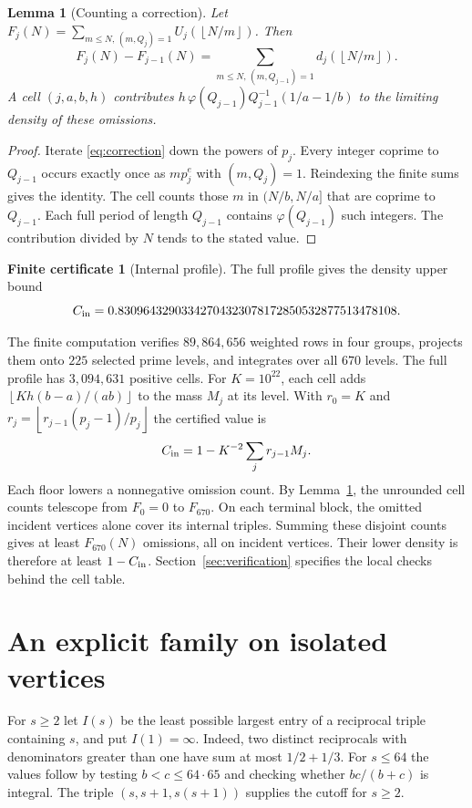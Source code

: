 \documentclass[11pt,letterpaper]{article}
\newtheorem{lemma}[theorem]{Lemma}
\theoremstyle{definition}
\newtheorem{certificate}[theorem]{Finite certificate}
\newcommand{\cin}{C_{\rm in}}
\newcommand{\floor}[1]{\left\lfloor #1\right\rfloor}
\begin{document}
\begin{lemma}[Counting a correction]\label{lem:telescoping}
Let $F_j(N)=\sum_{m\le N,\,(m,Q_j)=1} U_j(\floor{N/m})$. Then
\[
 F_j(N)-F_{j-1}(N)
    =\sum_{m\le N,\,(m,Q_{j-1})=1} d_j(\floor{N/m}).
\]
A cell $(j,a,b,h)$ contributes
$h\,\varphi(Q_{j-1})Q_{j-1}^{-1}(1/a-1/b)$ to the limiting
density of these omissions.
\end{lemma}
\begin{proof}
Iterate \eqref{eq:correction} down the powers of $p_j$. Every integer
coprime to $Q_{j-1}$ occurs exactly once as $m p_j^e$ with
$(m,Q_j)=1$. Reindexing the finite sums gives the identity. The cell
counts those $m$ in $(N/b,N/a]$ that are coprime to $Q_{j-1}$.
Each full period of length $Q_{j-1}$ contains $\varphi(Q_{j-1})$
such integers. The contribution divided by $N$ tends to the stated value.
\end{proof}

\begin{certificate}[Internal profile]\label{cert:in}
The full profile gives the density upper bound
\[
 \cin=0.83096432903342704323078172850532877513478108 .
\]
\end{certificate}
The finite computation verifies $89{,}864{,}656$ weighted rows in
four groups, projects them onto $225$ selected prime levels, and
integrates over all $670$ levels. The full profile has $3{,}094{,}631$
positive cells. For $K=10^{22}$, each cell adds
$\floor{K h(b-a)/(ab)}$ to the mass $M_j$ at its level. With $r_0=K$
and $r_j=\floor{r_{j-1}(p_j-1)/p_j}$ the certified value is
\begin{equation}
 \cin=1-K^{-2}\sum_j r_{j-1}M_j. \label{eq:inside}
\end{equation}
Each floor lowers a nonnegative omission count. By
Lemma~\ref{lem:telescoping}, the unrounded cell counts telescope from $F_0=0$ to $F_{670}$.
On each terminal block, the omitted incident vertices alone cover its
internal triples. Summing these disjoint counts gives at least $F_{670}(N)$
omissions, all on incident vertices. Their lower density is therefore at least $1-\cin$. Section~\ref{sec:verification} specifies the local
checks behind the cell table.

\section{An explicit family on isolated vertices}
For $s\ge 2$ let $I(s)$ be the least possible largest entry of a
reciprocal triple containing $s$, and put $I(1)=\infty$. Indeed, two distinct reciprocals with denominators greater than one have sum at most $1/2+1/3$.
For $s\le64$ the values follow by testing $b<c\le64\cdot65$ and
checking whether $bc/(b+c)$ is integral. The triple
$(s,s+1,s(s+1))$ supplies the cutoff for $s\ge2$.
\end{document}
